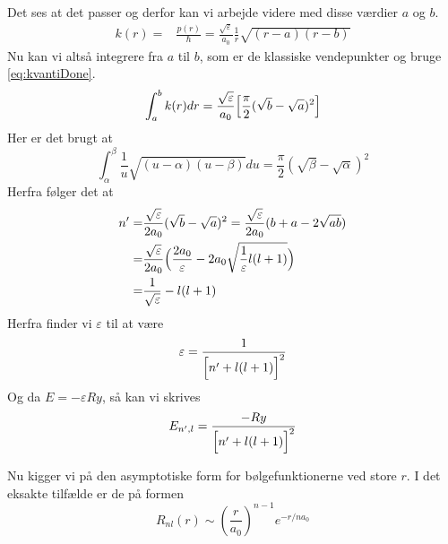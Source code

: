 Det ses at det passer og derfor kan vi arbejde videre med disse værdier $a$ og $b$.
\begin{align}
  k(r) = & \frac{p(r)}{\hbar} = \frac{\sqrt{\varepsilon}}{a_0}\frac{1}{r}\sqrt{(r-a)(r-b)}
\end{align}
Nu kan vi altså integrere fra $a$ til $b$, som er de klassiske vendepunkter og bruge \cref{eq:kvantiDone}.
\begin{equation}
  \int_{a}^{b}k(r)dr = \frac{\sqrt{\varepsilon}}{a_0} \Bigl[\frac{\pi}{2}(\sqrt{b}-\sqrt{a})^2  \Bigr]
\end{equation}
Her er det brugt at
\begin{equation}
  \int_{\alpha}^{\beta}\frac{1}{u}\sqrt{(u-\alpha)(u-\beta)}du = \frac{\pi}{2}(\sqrt{\beta}-\sqrt{\alpha})^2
\end{equation}
Herfra følger det at
\begin{align}
  n' = & \frac{\sqrt{\varepsilon}}{2a_0}(\sqrt{b}-\sqrt{a})^2 = \frac{\sqrt{\varepsilon}}{2a_0}(b+a-2\sqrt{ab})\\
     = & \frac{\sqrt{\varepsilon}}{2a_0}\Bigl(\frac{2a_0}{\varepsilon}-2a_0\sqrt{\frac{1}{\varepsilon}l(l+1)}\Bigr)\\
     = & \frac{1}{\sqrt{\varepsilon}} -l(l+1)
\end{align}
Herfra finder vi $\varepsilon$ til at være
\begin{equation}
  \varepsilon = \frac{1}{\Bigl[n'+l(l+1)  \Bigr]^2}
\end{equation}
Og da $E = -\varepsilon Ry$, så kan vi skrives
\begin{equation}
  E_{n',l} = \frac{-Ry}{\Bigl[n'+l(l+1)  \Bigr]^2}
\end{equation}

Nu kigger vi på den asymptotiske form for bølgefunktionerne ved store $r$.
I det eksakte tilfælde er de på formen
\begin{equation}
  R_{nl}(r) \sim \left(\frac{r}{a_0}\right)^{n-1}e^{-r/na_0}
\end{equation}

